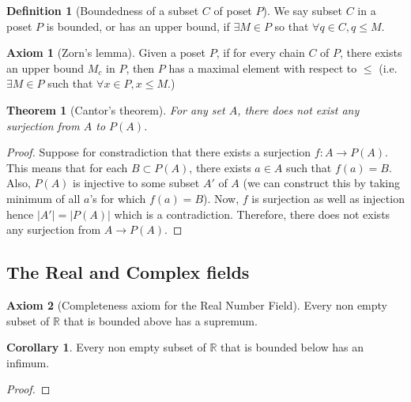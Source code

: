 \documentclass[12pt]{report}
\newtheorem{thm}{Theorem}
\theoremstyle{definition}
\newtheorem{defn}{Definition}
\newtheorem{cor}{Corollary}
\newtheorem{ax}{Axiom}
\newcommand{\R}{\mathbb{R}}
\begin{document}
\begin{defn}[Boundedness of a subset $C$ of poset $P$]
    We say subset $C$ in a poset $P$ is bounded, or has an upper bound, if $\exists M \in P$ so that $\forall q \in C, q \leq M$.   
\end{defn}
\begin{ax}[Zorn's lemma]
    Given a poset $P$, if for every chain $C$ of $P$, there exists an upper bound $M_c$ in $P$, then $P$ has a maximal element with respect to $\leq$ (i.e. $\exists M \in P$ such that $\forall x \in P, x \leq M$.)
\end{ax}
\begin{thm}[Cantor's theorem]
    For any set $A$, there does not exist any surjection from $A$ to $P(A)$.
\end{thm}
\begin{proof}
    Suppose for constradiction that there exists a surjection $f: A \to P(A)$. This means that for each $B \subset P(A)$, there exists $a \in A$ such that $f(a) = B$. Also, $P(A)$ is injective to some subset $A'$ of $A$ (we can construct this by taking minimum of all $a$'s for which $f(a) = B$). Now, $f$ is surjection as well as injection hence $|A'| = |P(A)|$ which is a contradiction. Therefore, there does not exists any surjection from $A \to P(A)$.
\end{proof}

\subsection*{The Real and Complex fields}
\begin{ax}[Completeness axiom for the Real Number Field]
    Every non empty subset of $\R$ that is bounded above has a supremum.
\end{ax}
\begin{cor}
    Every non empty subset of $\R$ that is bounded below has an infimum.
\end{cor}
\begin{proof}

\end{proof}
\end{document}
